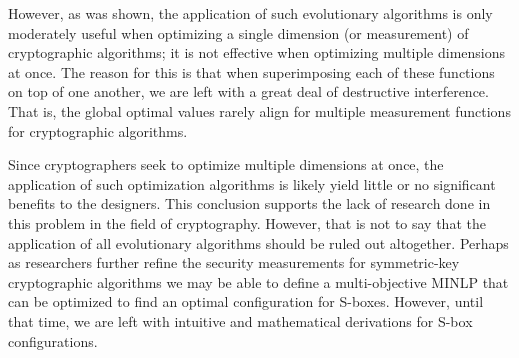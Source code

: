 \documentclass[11pt]{article}
\begin{document}
However, as was shown, the application of such evolutionary algorithms is only moderately useful when optimizing a single dimension (or measurement) of cryptographic algorithms; it is not effective when optimizing multiple dimensions at once. The reason for this is that when superimposing each of these functions on top of one another, we are left with a great deal of destructive interference. That is, the global optimal values rarely align for multiple measurement functions for cryptographic algorithms. 

Since cryptographers seek to optimize multiple dimensions at once, the application of such optimization algorithms is likely yield little or no significant benefits to the designers. This conclusion supports the lack of research done in this problem in the field of cryptography. However, that is not to say that the application of all evolutionary algorithms should be ruled out altogether. Perhaps as researchers further refine the security measurements for symmetric-key cryptographic algorithms we may be able to define a multi-objective MINLP that can be optimized to find an optimal configuration for S-boxes. However, until that time, we are left with intuitive and mathematical derivations for S-box configurations.



\end{document}
